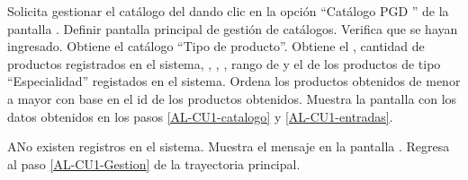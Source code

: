 \begin{UseCase}




\end{UseCase}

\gdef\actor{\UCpaso[\UCactor]}
\gdef\sistema{\UCpaso[\UCsist]}

\begin{UCtrayectoria}
    \actor Solicita gestionar el catálogo del  dando clic en la opción ``Catálogo PGD '' \hspace{0.1 cm} de la pantalla . \TODO Definir pantalla principal de gestión de catálogos.
    \sistema Verifica que se hayan ingresado. 
    \UCpaso [\UCsist] \label{AL-CU1-catalogo} Obtiene el catálogo ``Tipo de producto''.
    \UCpaso [\UCsist] \label{AL-CU1-entradas} Obtiene el , cantidad de productos registrados en el sistema, , ,  , rango de  y el  de los productos de tipo ``Especialidad'' registados en el sistema. 
    \UCpaso [\UCsist] Ordena los productos obtenidos de menor a mayor con base en el id de los productos obtenidos.
    \UCpaso [\UCsist] Muestra la pantalla  con los datos obtenidos en los pasos \ref{AL-CU1-catalogo} y \ref{AL-CU1-entradas}. 

\end{UCtrayectoria}


\begin{UCtrayectoriaA}{A}{No existen registros en el sistema.}
    \UCpaso [\UCsist] Muestra el mensaje  en la pantalla .
    \UCpaso [\UCsist] Regresa al paso \ref{AL-CU1-Gestion} de la trayectoria principal.
\end{UCtrayectoriaA} 


